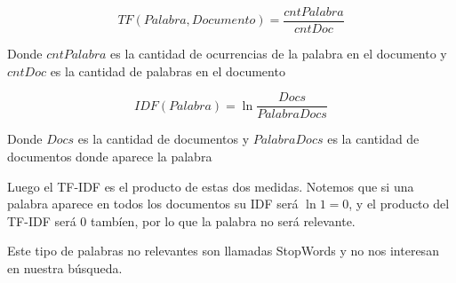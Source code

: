 \documentclass[a4paper,12pt]{article}
\begin{document}
\begin{equation}\label{eq:tf-formula}
    TF(Palabra, Documento) = \frac{cntPalabra}{cntDoc}
\end{equation}

Donde $cntPalabra$ es la cantidad de ocurrencias de la palabra en el documento y
$cntDoc$ es la cantidad de palabras en el documento

\begin{equation}\label{eq:idf-formula}
    IDF(Palabra) = \ln{\frac{Docs}{PalabraDocs}}
\end{equation}

Donde $Docs$ es la cantidad de documentos y $PalabraDocs$ es la cantidad de documentos donde aparece la palabra

Luego el TF-IDF es el producto de estas dos medidas. Notemos que si una palabra
aparece en todos los documentos su IDF será $\ln{1} = 0$, y el producto del TF-IDF será 0
tambíen, por lo que la palabra no será relevante.

Este tipo de palabras no relevantes son llamadas StopWords y no nos interesan en nuestra
búsqueda.
\end{document}
